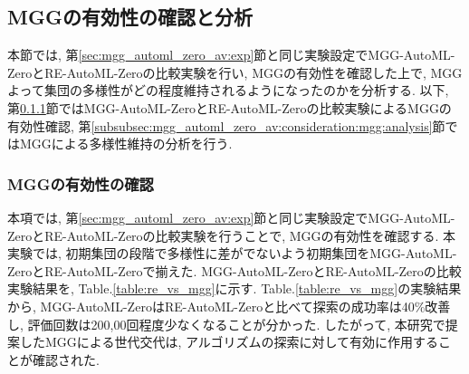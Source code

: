 \documentclass[11pt,oneside,openany,report]{jsbook}
\begin{document}
\subsection{MGGの有効性の確認と分析}\label{subsec:mgg_automl_zero_av:consideration:mgg}

本節では, 第\ref{sec:mgg_automl_zero_av:exp}節と同じ実験設定でMGG-AutoML-ZeroとRE-AutoML-Zeroの比較実験を行い, MGGの有効性を確認した上で, MGGよって集団の多様性がどの程度維持されるようになったのかを分析する. 以下, 第\ref{subsubsec:mgg_automl_zero_av:consideration:mgg:effect}節ではMGG-AutoML-ZeroとRE-AutoML-Zeroの比較実験によるMGGの有効性確認, 第\ref{subsubsec:mgg_automl_zero_av:consideration:mgg:analysis}節ではMGGによる多様性維持の分析を行う.

\subsubsection{MGGの有効性の確認}\label{subsubsec:mgg_automl_zero_av:consideration:mgg:effect}

本項では, 第\ref{sec:mgg_automl_zero_av:exp}節と同じ実験設定でMGG-AutoML-ZeroとRE-AutoML-Zeroの比較実験を行うことで, MGGの有効性を確認する. 本実験では, 初期集団の段階で多様性に差がでないよう初期集団をMGG-AutoML-ZeroとRE-AutoML-Zeroで揃えた. MGG-AutoML-ZeroとRE-AutoML-Zeroの比較実験結果を, Table.\ref{table:re_vs_mgg}に示す. Table.\ref{table:re_vs_mgg}の実験結果から, MGG-AutoML-ZeroはRE-AutoML-Zeroと比べて探索の成功率は40\%改善し, 評価回数は200,00回程度少なくなることが分かった. したがって, 本研究で提案したMGGによる世代交代は, アルゴリズムの探索に対して有効に作用することが確認された.
\end{document}
